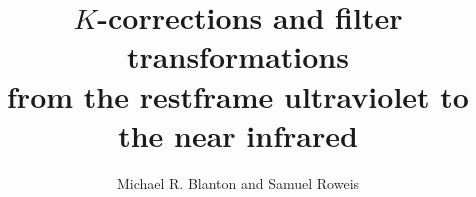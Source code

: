 \documentclass[10pt,preprint]{aastex}
\begin{document}
 
\title{$K$-corrections and filter transformations \\
from the restframe
ultraviolet to the near infrared}

\author{
Michael R. Blanton\altaffilmark{\ref{NYU}} and 
Samuel Roweis
}
\end{document}
